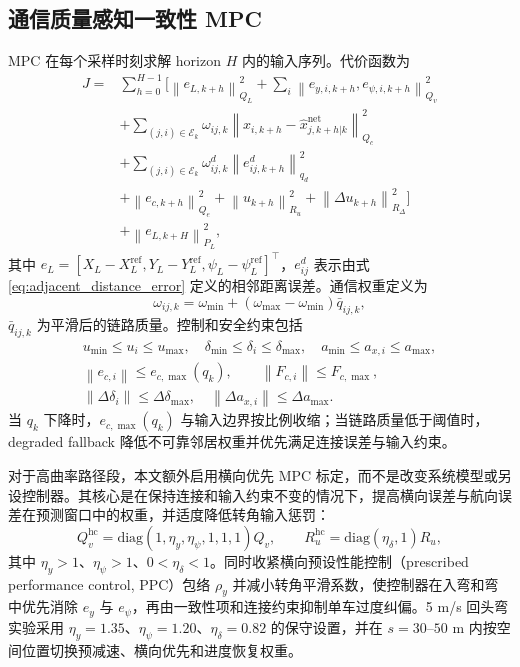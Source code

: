 \documentclass[twocolumn,3p,times,procedia]{elsarticle}
\newcommand{\norm}[1]{\left\lVert #1 \right\rVert}
\begin{document}
\subsection{通信质量感知一致性 MPC}

MPC 在每个采样时刻求解 horizon $H$ 内的输入序列。代价函数为
\begin{equation}
\begin{aligned}
J=&\sum_{h=0}^{H-1}
\Big[
\norm{e_{L,k+h}}_{Q_L}^2+
\sum_i\norm{e_{y,i,k+h},e_{\psi,i,k+h}}_{Q_v}^2\\
&+\sum_{(j,i)\in\mathcal E_k}\omega_{ij,k}\norm{x_{i,k+h}-\hat x_{j,k+h|k}^{\mathrm{net}}}_{Q_c}^2\\
&+\sum_{(j,i)\in\mathcal E_k}\omega^d_{ij,k}\norm{e^d_{ij,k+h}}_{q_d}^2\\
&+\norm{e_{c,k+h}}_{Q_e}^2+
\norm{u_{k+h}}_{R_u}^2+
\norm{\Delta u_{k+h}}_{R_\Delta}^2
\Big]\\
&+\norm{e_{L,k+H}}_{P_L}^2 ,
\end{aligned}
\label{eq:mpc_cost}
\end{equation}
其中 $e_L=[X_L-X_L^{\mathrm{ref}},Y_L-Y_L^{\mathrm{ref}},\psi_L-\psi_L^{\mathrm{ref}}]^\top$，$e^d_{ij}$ 表示由式 \eqref{eq:adjacent_distance_error} 定义的相邻距离误差。通信权重定义为
\begin{equation}
\omega_{ij,k}=\omega_{\min}+(\omega_{\max}-\omega_{\min})\bar q_{ij,k},
\label{eq:comm_weight}
\end{equation}
$\bar q_{ij,k}$ 为平滑后的链路质量。控制和安全约束包括
\begin{equation}
\begin{gathered}
u_{\min}\le u_i\le u_{\max},\quad
\delta_{\min}\le\delta_i\le\delta_{\max},\quad
a_{\min}\le a_{x,i}\le a_{\max},\\
\norm{e_{c,i}}\le e_{c,\max}(q_k),\qquad
\norm{F_{c,i}}\le F_{c,\max},\\
\norm{\Delta \delta_i}\le \Delta\delta_{\max},\quad
\norm{\Delta a_{x,i}}\le \Delta a_{\max}.
\end{gathered}
\label{eq:constraints}
\end{equation}
当 $q_k$ 下降时，$e_{c,\max}(q_k)$ 与输入边界按比例收缩；当链路质量低于阈值时，degraded fallback 降低不可靠邻居权重并优先满足连接误差与输入约束。

对于高曲率路径段，本文额外启用横向优先 MPC 标定，而不是改变系统模型或另设控制器。其核心是在保持连接和输入约束不变的情况下，提高横向误差与航向误差在预测窗口中的权重，并适度降低转角输入惩罚：
\begin{equation}
Q_v^{\mathrm{hc}}=\mathrm{diag}(1,\eta_y,\eta_\psi,1,1,1)Q_v,\qquad
R_u^{\mathrm{hc}}=\mathrm{diag}(\eta_\delta,1)R_u ,
\label{eq:high_curvature_lateral_priority}
\end{equation}
其中 $\eta_y>1$、$\eta_\psi>1$、$0<\eta_\delta<1$。同时收紧横向预设性能控制（prescribed performance control, PPC）包络 $\rho_y$ 并减小转角平滑系数，使控制器在入弯和弯中优先消除 $e_y$ 与 $e_\psi$，再由一致性项和连接约束抑制单车过度纠偏。5 m/s 回头弯实验采用 $\eta_y=1.35$、$\eta_\psi=1.20$、$\eta_\delta=0.82$ 的保守设置，并在 $s=30$--$50$ m 内按空间位置切换预减速、横向优先和进度恢复权重。
\end{document}
